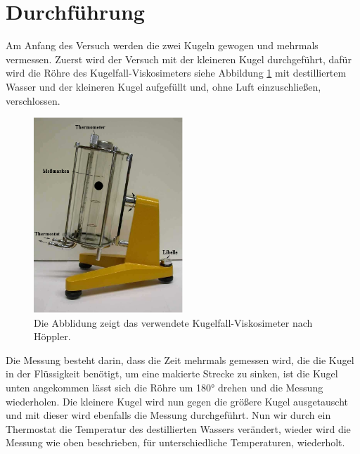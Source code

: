 \section{Durchführung}
\label{sec:Durchführung}
Am Anfang des Versuch werden die zwei Kugeln gewogen
und mehrmals vermessen. Zuerst wird der Versuch mit
der kleineren Kugel durchgeführt, dafür wird die
Röhre des Kugelfall-Viskosimeters siehe Abbildung \ref{abb:visko} mit destilliertem Wasser und der kleineren Kugel
aufgefüllt und, ohne Luft einzuschließen, verschlossen.
\begin{figure}
 \centering
 \includegraphics[width=0.5\textwidth]{bild.PNG}
\caption{Die Abblidung zeigt das verwendete Kugelfall-Viskosimeter nach Höppler.\cite{sample}}
\label{abb:visko}
\end{figure}
Die Messung besteht darin, dass die Zeit mehrmals
gemessen wird, die die Kugel in der Flüssigkeit benötigt,
um eine makierte Strecke zu sinken, ist die Kugel unten angekommen
lässt sich die Röhre um 180° drehen und die Messung wiederholen.
Die kleinere Kugel wird nun gegen die größere Kugel
ausgetauscht und mit dieser wird ebenfalls die Messung
durchgeführt. Nun wir durch ein Thermostat
die Temperatur des destillierten Wassers verändert,
wieder wird die Messung wie oben beschrieben,
für unterschiedliche
Temperaturen, wiederholt.
